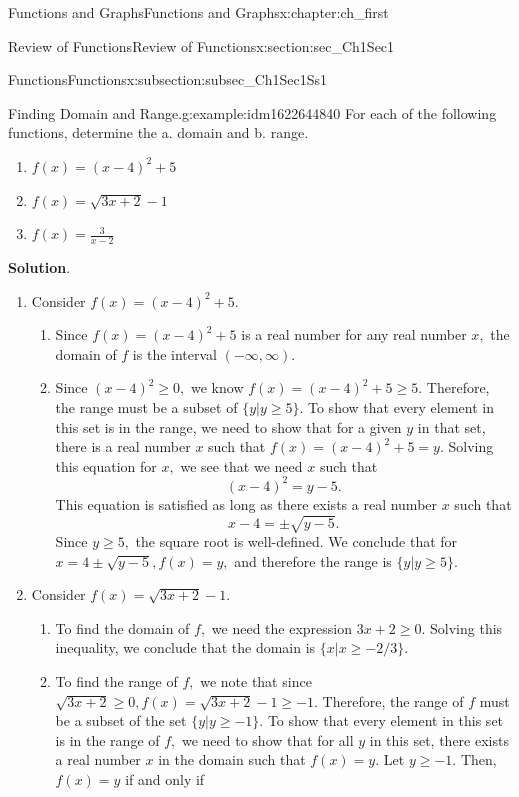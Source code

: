 \documentclass[oneside,10pt,]{book}
\newcommand{\blocktitlefont}{\relax}
\numberwithin{equation}{section}
\begin{document}
\begin{chapterptx}{Functions and Graphs}{}{Functions and Graphs}{}{}{x:chapter:ch_first}
\begin{sectionptx}{Review of Functions}{}{Review of Functions}{}{}{x:section:sec_Ch1Sec1}
\begin{subsectionptx}{Functions}{}{Functions}{}{}{x:subsection:subsec_Ch1Sec1Ss1}
\begin{example}{Finding Domain and Range.}{g:example:idm1622644840}%
For each of the following functions, determine the a. domain and b. range.%
%
\begin{enumerate}
\item{}\(\displaystyle f(x)=(x-4)^2+5\)%
\item{}\(\displaystyle f(x)=\sqrt{3x+2}-1\)%
\item{}\(\displaystyle f(x)=\frac{3}{x-2}\)%
\end{enumerate}
\par\smallskip%
\noindent\textbf{\blocktitlefont Solution}.\hypertarget{g:solution:idm1622636392}{}\quad{}%
\begin{enumerate}
\item{}Consider \(f(x)=(x-4)^2+5.\)%
%
\begin{enumerate}
\item{}Since \(f(x)=(x-4)^2+5\) is a real number for any real number \(x,\) the domain of \(f\) is the interval \((-\infty, \infty).\)%
\item{}Since \((x-4)^2 \geq 0,\) we know \(f(x)=(x-4)^2+5 \geq 5.\) Therefore, the range must be a subset of \(\{y|y \geq 5\}.\) To show that every element in this set is in the range, we need to show that for a given \(y\) in that set, there is a real number \(x\) such that \(f(x)=(x-4)^2+5=y.\) Solving this equation for \(x,\) we see that we need \(x\) such that%
\begin{equation*}
(x-4)^2=y-5.
\end{equation*}
This equation is satisfied as long as there exists a real number \(x\) such that%
\begin{equation*}
x-4= \pm \sqrt{y-5}.
\end{equation*}
Since \(y \geq 5,\) the square root is well-defined. We conclude that for \(x=4 \pm \sqrt{y-5},f(x)=y,\) and therefore the range is \(\{y|y \geq 5\}.\)%
\end{enumerate}
\item{}Consider \(f(x)=\sqrt{3x+2}-1.\)%
%
\begin{enumerate}
\item{}To find the domain of \(f,\) we need the expression \(3x+2 \geq 0.\) Solving this inequality, we conclude that the domain is \(\{x|x\geq-2/3\}.\)%
\item{}To find the range of \(f,\) we note that since \(\sqrt{3x+2}\geq 0,f(x)=\sqrt{3x+2}-1\geq -1.\) Therefore, the range of \(f\) must be a subset of the set \(\{y|y\geq-1\}.\) To show that every element in this set is in the range of \(f,\) we need to show that for all \(y\) in this set, there exists a real number \(x\) in the domain such that \(f(x)=y.\) Let \(y\geq-1.\) Then, \(f(x)=y\) if and only if%

\end{enumerate}
\end{enumerate}
\end{example}
\end{subsectionptx}
\end{sectionptx}
\end{chapterptx}
\end{document}

